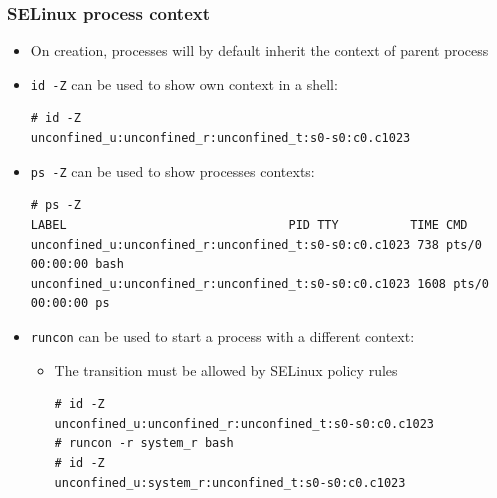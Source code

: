 \begin{frame}[fragile]
	\frametitle{SELinux process context}
	\begin{itemize}
		\item On creation, processes will by default inherit the context of parent
			process
		\item \texttt{id -Z} can be used to show own context in a shell:
			\begin{block}{}
				{\tiny
				\begin{verbatim}
# id -Z
unconfined_u:unconfined_r:unconfined_t:s0-s0:c0.c1023
\end{verbatim}
}
			\end{block}
		\item \texttt{ps -Z} can be used to show processes contexts:
			\begin{block}{}
				{\tiny
				\begin{verbatim}
# ps -Z
LABEL                               PID TTY          TIME CMD
unconfined_u:unconfined_r:unconfined_t:s0-s0:c0.c1023 738 pts/0 00:00:00 bash
unconfined_u:unconfined_r:unconfined_t:s0-s0:c0.c1023 1608 pts/0 00:00:00 ps
\end{verbatim}
}
			\end{block}
		\item \texttt{runcon} can be used to start a process with a different
			context:
			\begin{itemize}
				\item The transition must be allowed by SELinux policy rules
					\begin{block}{}
						{\tiny
						\begin{verbatim}
# id -Z
unconfined_u:unconfined_r:unconfined_t:s0-s0:c0.c1023
# runcon -r system_r bash
# id -Z
unconfined_u:system_r:unconfined_t:s0-s0:c0.c1023
\end{verbatim}
}
					\end{block}
			\end{itemize}
	\end{itemize}
\end{frame}


